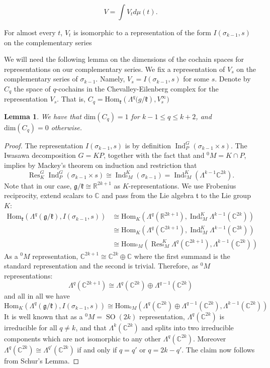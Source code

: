 \documentclass[12pt,reqno]{amsart}
\newcommand{\R}{\mathbb{R}}
\newcommand{\C}{\mathbb{C}}
\newtheorem{lemma}[theorem]{Lemma}
\theoremstyle{definition}
\newcommand{\SO}{\operatorname{SO}}
\newcommand{\Ind}{\operatorname{Ind}}
\newcommand{\Res}{\operatorname{Res}}
\begin{document}
$$V = \int V_t d\mu(t).$$

For almost every $t$, $V_t$ is isomorphic to a representation of the form $I(\sigma_{k-1},s)$ on the complementary series

We will need the following lemma on the dimensions of the cochain spaces for representations on our complementary series. We fix a representation of $V_s$ on the complementary series of $\sigma_{k-1}$. Namely, $V_s=I(\sigma_{k-1},s)$ for some $s$. Denote by $C_q$ the space of $q$-cochains in the Chevalley-Eilenberg complex for the representation $V_s$. That is, $C_q=\mathrm{Hom}_\mathfrak{k}(\Lambda^q \mathfrak({g}/\mathfrak{k}), V_s^\infty)$

\begin{lemma} \label{lem:one dimensional}
    We have that $\mathrm{dim}(C_q)=1$ for $k-1 \leq q \leq k+2$, and $\mathrm{dim}(C_q)=0$ otherwise.
\end{lemma}

\begin{proof}
The representation $I(\sigma_{k-1},s)$ is by definition $\Ind_P^G( \sigma_{k-1}\times s)$. The Iwasawa decomposition $G =KP$, together with the fact that and ${^0}M = K \cap P$, implies by Mackey's theorem on induction and restriction that $$\Res^G_K\Ind_P^G(\sigma_{k-1}\times s) \cong \Ind_{{^0}M}^K(\sigma_{k-1}) = \Ind_{^0M}^K(\Lambda^{k-1}\C^{2k}).$$
Note that in our case, $\mathfrak{g}/\mathfrak{k} \cong \R^{2k+1}$ as $K$-representations. We use Frobenius reciprocity, extend scalars to $\C$ and pass from the Lie algebra $\mathfrak t$ to the Lie group $K$:
\begin{align*}
\mathrm{Hom}_\mathfrak{k}(\Lambda^q (\mathfrak{g}/\mathfrak{k}), I(\sigma_{k-1},s)) 
&\cong \mathrm{Hom}_K(\Lambda^{q}(\R^{2k+1}), \Ind_{^0M}^K \Lambda^{k-1}(\C^{2k})) \\
&\cong \mathrm{Hom}_K(\Lambda^{q}(\C^{2k+1}), \Ind_{^0M}^K \Lambda^{k-1}(\C^{2k})) \\
&\cong \mathrm{Hom}_{^0M}(\Res_{^0M}^K \Lambda^{q}(\C^{2k+1}), \Lambda^{k-1}(\C^{2k}))
\end{align*}
As a ${^0}M$ representation, $\C^{2k+1} \cong \C^{2k}\oplus \C$ where the first summand is the standard representation and the second is trivial. Therefore, as $^0M$ representations:
$$\Lambda^q(\C^{2k+1}) \cong \Lambda^q(\C^{2k})\oplus\Lambda^{q-1}(\C^{2k})$$
and all in all we have
$$\mathrm{Hom}_K(\Lambda^q (\mathfrak{g}/\mathfrak{k}), I(\sigma_{k-1},s)) \cong \mathrm{Hom}_{^0M}(\Lambda^q(\C^{2k})\oplus\Lambda^{q-1}(\C^{2k}), \Lambda^{k-1}(\C^{2k}))$$
It is well known that as a $^0M =\SO(2k)$ representation, $\Lambda^q(\C^{2k})$ is irreducible for all $q \neq k$, and that $\Lambda^k(\C^{2k})$ and splits into two irreducible components which are not isomorphic to any other $\Lambda^{q}(\C^{2k})$. Moreover $\Lambda^q(\C^{2k}) \cong \Lambda^{q'}(\C^{2k})$ if and only if $q=q'$ or $q=2k-q'$. The claim now follows from Schur's Lemma.
\end{proof}
\end{document}
